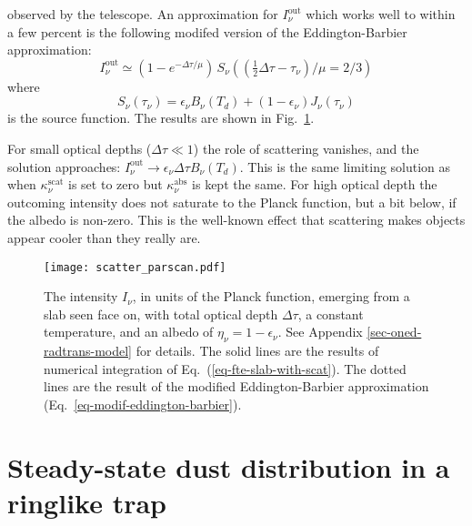 \documentclass{aa}
\begin{document}
observed by the telescope. An approximation for $I_\nu^{\mathrm{out}}$ which
works well to within a few percent is the following modifed version of the
Eddington-Barbier approximation:
\begin{equation}\label{eq-modif-eddington-barbier}
I_\nu^{\mathrm{out}} \simeq \left(1-e^{-\Delta\tau/\mu}\right)\,S_\nu\left((\tfrac{1}{2}\Delta\tau-\tau_\nu)/\mu=2/3\right)
\end{equation}
where
\begin{equation}
S_\nu(\tau_\nu) = \epsilon_\nu B_\nu(T_d) + (1-\epsilon_\nu) J_\nu(\tau_\nu)
\end{equation}
is the source function. The results are shown in Fig.~\ref{fig-scatter-parscan}.

For small optical depths ($\Delta\tau\ll 1$) the role of scattering vanishes,
and the solution approaches: $I_\nu^{\mathrm{out}} \rightarrow \epsilon_\nu\Delta\tau
B_\nu(T_d)$.  This is the same limiting solution as when
$\kappa_\nu^{\mathrm{scat}}$ is set to zero but $\kappa_\nu^{\mathrm{abs}}$ is
kept the same. For high optical depth the outcoming intensity does not saturate
to the Planck function, but a bit below, if the albedo is non-zero. This is the
well-known effect that scattering makes objects appear cooler than they really
are.


\begin{figure}
\centerline{\texttt{[image: scatter\_parscan.pdf]}}
\caption{\label{fig-scatter-parscan}The intensity $I_\nu$, in units of the
  Planck function, emerging from a slab seen face on, with total optical depth
  $\Delta\tau$, a constant temperature, and an albedo of
  $\eta_\nu=1-\epsilon_\nu$. See Appendix \ref{sec-oned-radtrans-model} for
  details. The solid lines are the results of numerical integration of
  Eq.~(\ref{eq-fte-slab-with-scat}). The dotted lines are the result of the
  modified Eddington-Barbier approximation
  (Eq.~\ref{eq-modif-eddington-barbier}).}
\end{figure}


\section{Steady-state dust distribution in a ringlike trap}
\label{sec-steady-state-analytic-trap-model}
%
\end{document}

